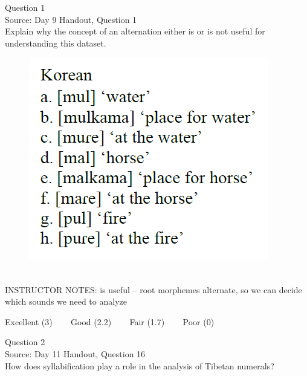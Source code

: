 \documentclass[12pt]{article}
\begin{document}
\begin{center}
\textbf{{\color{blue}{\HUGE START OF EXAM\\}}}

\textbf{{\color{blue}{\HUGE Student ID: 8350\\}}}

\textbf{{\color{blue}{\HUGE 5:00 - 5:20 PM\\}}}

\end{center}
\newpage

{\large Question 1}\\

Source: Day 9 Handout, Question 1\\

Explain why the concept of an alternation either is or is not useful for understanding this dataset.\\

\begin{figure}[H]
\includegraphics{../images/korean.png}
\end{figure}

~\\
INSTRUCTOR NOTES: is useful -- root morphemes alternate, so we can decide which sounds we need to analyze


\vfill
Excellent (3) ~~~ Good (2.2) ~~~ Fair (1.7) ~~~ Poor (0)
\newpage

{\large Question 2}\\

Source: Day 11 Handout, Question 16\\

How does syllabification play a role in the analysis of Tibetan numerals?\\
\end{document}
